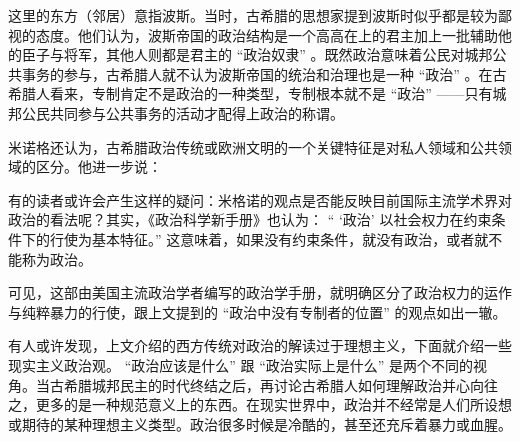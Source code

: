 
这里的东方（邻居）意指波斯。当时，古希腊的思想家提到波斯时似乎都是较为鄙视的态度。他们认为，波斯帝国的政治结构是一个高高在上的君主加上一批辅助他的臣子与将军，其他人则都是君主的 “政治奴隶” 。既然政治意味着公民对城邦公共事务的参与，古希腊人就不认为波斯帝国的统治和治理也是一种 “政治” 。在古希腊人看来，专制肯定不是政治的一种类型，专制根本就不是 “政治” ——只有城邦公民共同参与公共事务的活动才配得上政治的称谓。

米诺格还认为，古希腊政治传统或欧洲文明的一个关键特征是对私人领域和公共领域的区分。他进一步说：


有的读者或许会产生这样的疑问：米格诺的观点是否能反映目前国际主流学术界对政治的看法呢？其实，《政治科学新手册》也认为： “ ‘政治’ 以社会权力在约束条件下的行使为基本特征。” 这意味着，如果没有约束条件，就没有政治，或者就不能称为政治。


可见，这部由美国主流政治学者编写的政治学手册，就明确区分了政治权力的运作与纯粹暴力的行使，跟上文提到的 “政治中没有专制者的位置” 的观点如出一辙。


有人或许发现，上文介绍的西方传统对政治的解读过于理想主义，下面就介绍一些现实主义政治观。 “政治应该是什么” 跟 “政治实际上是什么” 是两个不同的视角。当古希腊城邦民主的时代终结之后，再讨论古希腊人如何理解政治并心向往之，更多的是一种规范意义上的东西。在现实世界中，政治并不经常是人们所设想或期待的某种理想主义类型。政治很多时候是冷酷的，甚至还充斥着暴力或血腥。

